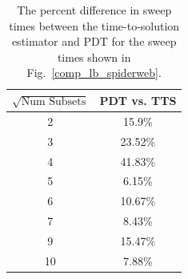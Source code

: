 \documentclass[times,final]{elsarticle}
\begin{document}
\begin{table}[!ht]
\centering
\caption{The percent difference in sweep times between the time-to-solution estimator and PDT for the sweep times shown in Fig.~\ref{comp_lb_spiderweb}.}
\label{diff_lb_spiderweb}
\begin{tabular}{c|c}
\textbf{$\sqrt{\text{Num Subsets}}$} & \bf PDT vs. TTS \\ \hline
2&15.9\%\\ \hline
3&23.52\%\\ \hline
4&41.83\%\\ \hline
5&6.15\%\\ \hline
6&10.67\%\\ \hline
7&8.43\%\\ \hline
9&15.47\%\\ \hline
10&7.88\%
\end{tabular}
\end{table}
\end{document}
